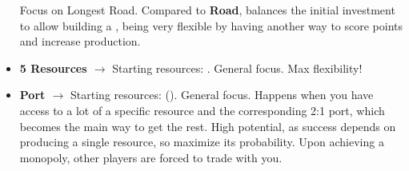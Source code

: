 \documentclass[12pt]{article}
\begin{document}
\begin{itemize}
    Focus on Longest Road.
    Compared to \textbf{Road}, balances the initial investment to allow building a , being very flexible by having another way to score points and increase production.
    \item \textbf{5 Resources $\rightarrow$}
    Starting resources: .
    General focus.
    Max flexibility!
    \item \textbf{Port $\rightarrow$}
    Starting resources: ().
    General focus.
    Happens when you have access to a lot of a specific resource and the corresponding 2:1 port, which becomes the main way to get the rest.
    High potential, as success depends on producing a single resource, so maximize its probability.
    Upon achieving a monopoly, other players are forced to trade with you.
\end{itemize}
\end{document}
